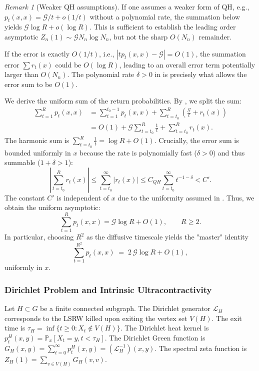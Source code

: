 \documentclass{article}
\numberwithin{equation}{section}
\theoremstyle{definition}
\theoremstyle{remark}
\newtheorem{remark}[theorem]{Remark}
\newcommand{\cG}{\mathcal{G}}
\newcommand{\LL}{\mathcal{L}}
\newcommand{\Prob}{\mathbb{P}}
\begin{document}
\begin{remark}[Weaker QH assumptions]\label{rem:weaker_QH}
If one assumes a weaker form of QH, e.g., $p_t(x,x) = \cG/t + o(1/t)$ without a polynomial rate, the summation below yields $\cG \log R + o(\log R)$. This is sufficient to establish the leading order asymptotic $Z_n(1) \sim \cG N_n \log N_n$, but not the sharp $O(N_n)$ remainder.

If the error is exactly $O(1/t)$, i.e., $|t p_t(x,x) - \cG| = O(1)$, the summation error $\sum r_t(x)$ could be $O(\log R)$, leading to an overall error term potentially larger than $O(N_n)$. The polynomial rate $\delta>0$ in  is precisely what allows the error sum to be $O(1)$.
\end{remark}

We derive the uniform sum of the return probabilities. By , we split the sum:
\begin{align*}
\sum_{t=1}^{R} p_t(x,x) &= \sum_{t=1}^{t_0-1} p_t(x,x) + \sum_{t=t_0}^{R} \left(\frac{\cG}{t} + r_t(x)\right) \\
&= O(1) + \cG \sum_{t=t_0}^{R} \frac{1}{t} + \sum_{t=t_0}^{R} r_t(x).
\end{align*}
The harmonic sum is $\sum_{t=t_0}^{R} \frac{1}{t} = \log R + O(1)$.
Crucially, the error sum is bounded uniformly in $x$ because the rate is polynomially fast ($\delta>0$) and thus summable ($1+\delta > 1$):
\[
\left|\sum_{t=t_0}^{R} r_t(x)\right| \leq \sum_{t=t_0}^{\infty} |r_t(x)| \leq C_{QH} \sum_{t=t_0}^{\infty} t^{-1-\delta} < C'.
\]
The constant $C'$ is independent of $x$ due to the uniformity assumed in .
Thus, we obtain the uniform asymptotic:
\begin{equation}\label{eq:return-sum}
\sum_{t=1}^{R} p_t(x,x) = \cG \log R + O(1), \qquad R \geq 2.
\end{equation}
In particular, choosing $R^2$ as the diffusive timescale yields the "master" identity
\begin{equation}\label{eq:master-sum}
  \sum_{t=1}^{R^{2}} p_t(x,x)
  \;=\; 2\,\cG \log R + O(1),
\end{equation}
uniformly in $x$.


\subsubsection{Dirichlet Problem and Intrinsic Ultracontractivity}
Let $H \subset G$ be a finite connected subgraph.
The Dirichlet generator $\LL_H$ corresponds to the LSRW killed upon exiting the vertex set $V(H)$. The exit time is $\tau_H = \inf\{t \geq 0 : X_t \notin V(H)\}$.
The Dirichlet heat kernel is $p_t^H(x,y) = \Prob_x[X_t = y, t < \tau_H]$. The Dirichlet Green function is $G_H(x,y) = \sum_{t=0}^{\infty} p_t^H(x,y) = (\LL_H^{-1})(x,y)$. The spectral zeta function is $Z_H(1) = \sum_{v \in V(H)} G_H(v,v)$.
\end{document}
